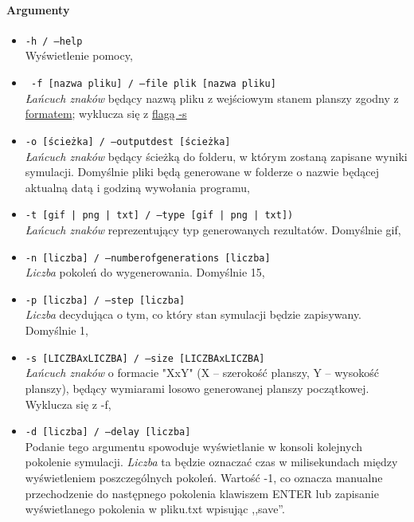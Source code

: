 \documentclass{report}
\begin{document}
\paragraph{Argumenty} \label{argumenty}
\begin{itemize}
\item \texttt{-h / --help} \\ Wyświetlenie pomocy,
\item \texttt{ -f [nazwa pliku]  / --file plik [nazwa pliku] } 
	\\ \textit{ Łańcuch znaków }będący nazwą pliku z wejściowym stanem planszy zgodny z \hyperref[format]{\textcolor{LinkColor}{formatem}}; wyklucza się z  \hyperref[s]{\textcolor{LinkColor}{flagą -s}}
\item \texttt{-o [ścieżka] / --output\textunderscore{}dest [ścieżka]}  \\\textit{ Łańcuch znaków }będący ścieżką do folderu, w którym zostaną zapisane wyniki \label{output_dest} symulacji. Domyślnie pliki  będą generowane w folderze  o nazwie będącej aktualną datą i godziną wywołania programu,
\item \texttt{-t [gif | png | txt] / --type [gif | png | txt])} \\\textit{ Łańcuch znaków }reprezentujący typ generowanych rezultatów. Domyślnie gif, \label{output_args}
\item \texttt{-n [liczba] / --number\textunderscore{}of\textunderscore{}generations [liczba]} \\ \textit{ Liczba } pokoleń do wygenerowania. Domyślnie 15,
\item \texttt{-p [liczba] / --step [liczba]} \\ \textit{ Liczba }decydująca o tym, co który stan symulacji będzie zapisywany. Domyślnie 1,
\item \label{s} \texttt{-s [LICZBAxLICZBA] / --size [LICZBAxLICZBA]} \\ \textit{ Łańcuch znaków } o formacie "XxY" (X -- szerokość planszy, Y -- wysokość planszy), będący wymiarami losowo generowanej planszy początkowej. Wyklucza się z -f, 
\item \label{delay} \texttt{-d [liczba] / --delay [liczba]} \\ Podanie tego argumentu spowoduje wyświetlanie w konsoli kolejnych pokolenie symulacji. \textit{ Liczba } ta będzie oznaczać czas  w milisekundach między wyświetleniem poszczególnych pokoleń. Wartość -1, co oznacza manualne przechodzenie do następnego pokolenia klawiszem ENTER lub zapisanie wyświetlanego pokolenia w pliku.txt wpisując ,,save''.
\end{itemize}
\end{document}
